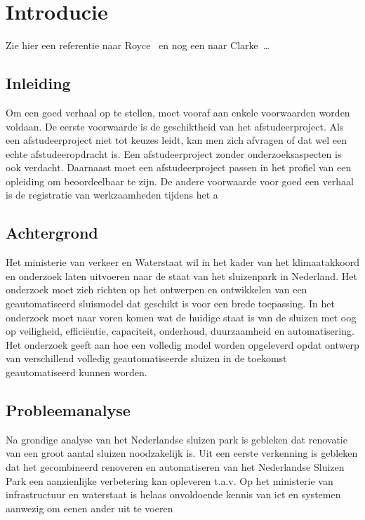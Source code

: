 
\newpage
\section{Introducie}
Zie hier een referentie naar Royce~\cite{royce1987managing} en nog een naar Clarke~\cite{modelchecking}\ldots 

\subsection{Inleiding}
Om een goed verhaal op te stellen, moet vooraf aan enkele voorwaarden
worden voldaan. De eerste voorwaarde is de geschiktheid van het
afstudeerproject. Als een afstudeerproject niet tot keuzes leidt, kan
men zich afvragen of dat wel een echte afstudeeropdracht is. Een
afstudeerproject zonder onderzoeksaspecten is ook verdacht. Daarnaast
moet een afstudeerproject passen in het profiel van een opleiding om
beoordeelbaar te zijn. De andere voorwaarde voor goed een verhaal is
de registratie van werkzaamheden tijdens het a
\subsection{Achtergrond}


Het ministerie van verkeer en Waterstaat wil in het kader van het klimaatakkoord en onderzoek laten uitvoeren naar de staat van het sluizenpark in Nederland. Het onderzoek moet zich richten op het ontwerpen en ontwikkelen van een geautomatiseerd sluismodel dat geschikt is voor een brede toepassing. In het onderzoek moet naar voren komen wat de huidige staat is van de sluizen met oog op veiligheid, efficiëntie, capaciteit, onderhoud, duurzaamheid en automatisering. Het onderzoek geeft aan hoe een volledig model worden opgeleverd opdat ontwerp van verschillend volledig geautomatiseerde sluizen in de toekomst geautomatiseerd kunnen worden.  


\subsection{Probleemanalyse} 





Na grondige analyse van het Nederlandse sluizen park is gebleken dat renovatie van een groot aantal sluizen noodzakelijk is.  Uit een eerste verkenning is gebleken  dat het gecombineerd renoveren en automatiseren van het Nederlandse Sluizen Park een aanzienlijke verbetering kan opleveren t.a.v. 
Op  het  ministerie  van  infrastructuur  en waterstaat is helaas onvoldoende kennis van ict en systemen aanwezig om eenen ander uit te voeren 



